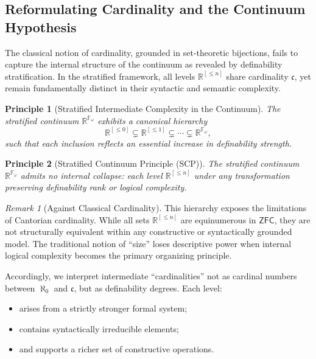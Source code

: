 \documentclass[12pt]{article}
\theoremstyle{definition}
\theoremstyle{plain}
\newtheorem{principle}{Principle}[section]
\theoremstyle{remark}
\newtheorem*{remark}{Remark}
\begin{document}
\subsection{Reformulating Cardinality and the Continuum Hypothesis}

The classical notion of cardinality, grounded in set-theoretic bijections, fails to capture the internal structure of the continuum as revealed by definability stratification. In the stratified framework, all levels \( \mathbb{R}^{[\leq n]} \) share cardinality \( \mathfrak{c} \), yet remain fundamentally distinct in their syntactic and semantic complexity.

\begin{principle}[Stratified Intermediate Complexity in the Continuum]
The stratified continuum \( \mathbb{R}^{\mathbb{F}_\omega} \) exhibits a canonical hierarchy
\[
\mathbb{R}^{[\leq 0]} \subsetneq \mathbb{R}^{[\leq 1]} \subsetneq \cdots \subsetneq \mathbb{R}^{\mathbb{F}_\omega},
\]
such that each inclusion reflects an essential increase in definability strength.
\end{principle}

\begin{principle}[Stratified Continuum Principle (SCP)]
The stratified continuum \( \mathbb{R}^{\mathbb{F}_\omega} \) admits no internal collapse: each level \( \mathbb{R}^{[\leq n]} \) under any transformation preserving definability rank or logical complexity.
\end{principle}

\begin{remark}[Against Classical Cardinality]
This hierarchy exposes the limitations of Cantorian cardinality. While all sets \( \mathbb{R}^{[\leq n]} \) are equinumerous in \( \mathsf{ZFC} \), they are not structurally equivalent within any constructive or syntactically grounded model. The traditional notion of “size” loses descriptive power when internal logical complexity becomes the primary organizing principle.

Accordingly, we interpret intermediate “cardinalities” not as cardinal numbers between \( \aleph_0 \) and \( \mathfrak{c} \), but as definability degrees. Each level:
\begin{itemize}
    \item arises from a strictly stronger formal system;
    \item contains syntactically irreducible elements;
    \item and supports a richer set of constructive operations.
\end{itemize}
\end{remark}
\end{document}
